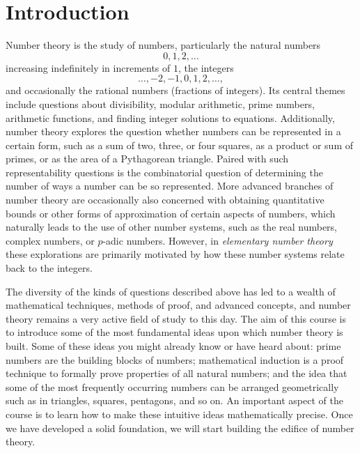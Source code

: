 \chapter{Introduction}\label{chapter:introduction}

Number theory is the study of numbers, particularly the natural numbers
\begin{equation*}
  0,1,2,\ldots
\end{equation*}
increasing indefinitely in increments of $1$, the integers 
\begin{equation*}
  \ldots, -2, -1, 0, 1, 2, \ldots,
\end{equation*}
and occasionally the rational numbers (fractions of integers). Its central themes include questions about divisibility, modular arithmetic, prime numbers, arithmetic functions, and finding integer solutions to equations. Additionally, number theory explores the question whether numbers can be represented in a certain form, such as a sum of two, three, or four squares, as a product or sum of primes, or as the area of a Pythagorean triangle. Paired with such representability questions is the combinatorial question of determining the number of ways a number can be so represented. More advanced branches of number theory are occasionally also concerned with obtaining quantitative bounds or other forms of approximation of certain aspects of numbers, which naturally leads to the use of other number systems, such as the real numbers, complex numbers, or $p$-adic numbers. However, in \emph{elementary number theory} these explorations are primarily motivated by how these number systems relate back to the integers.

The diversity of the kinds of questions described above has led to a wealth of mathematical techniques, methods of proof, and advanced concepts, and number theory remains a very active field of study to this day. The aim of this course is to introduce some of the most fundamental ideas upon which number theory is built. Some of these ideas you might already know or have heard about: prime numbers are the building blocks of numbers; mathematical induction is a proof technique to formally prove properties of all natural numbers; and the idea that some of the most frequently occurring numbers can be arranged geometrically such as in triangles, squares, pentagons, and so on. An important aspect of the course is to learn how to make these intuitive ideas mathematically precise. Once we have developed a solid foundation, we will start building the edifice of number theory.

